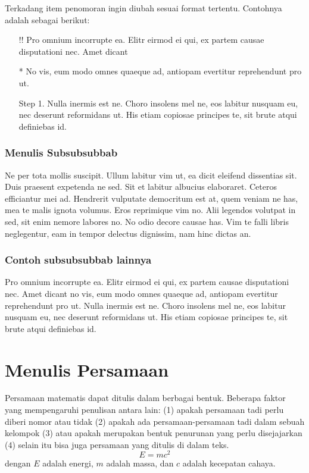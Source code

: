 Terkadang item penomoran ingin diubah sesuai format tertentu. Contohnya adalah sebagai berikut:
\begin{itemize}
    \item[!!] Pro omnium incorrupte ea. Elitr eirmod ei qui, ex partem causae disputationi nec. Amet dicant
    \item[*] No vis, eum modo omnes quaeque ad, antiopam evertitur reprehendunt pro ut.
    \item[Step 1.] Nulla inermis est ne. Choro insolens mel ne, eos labitur nusquam eu, nec deserunt reformidans ut. His etiam copiosae principes te, sit brute atqui definiebas id.
\end{itemize}


\subsubsection{Menulis Subsubsubbab}
Ne per tota mollis suscipit. Ullum labitur vim ut, ea dicit eleifend dissentias sit. Duis praesent expetenda ne sed. Sit et labitur albucius elaboraret. Ceteros efficiantur mei ad. Hendrerit vulputate democritum est at, quem veniam ne has, mea te malis ignota volumus. Eros reprimique vim no. Alii legendos volutpat in sed, sit enim nemore labores no. No odio decore causae has. Vim te falli libris neglegentur, eam in tempor delectus dignissim, nam hinc dictas an.

\subsubsection{Contoh subsubsubbab lainnya}
Pro omnium incorrupte ea. Elitr eirmod ei qui, ex partem causae disputationi nec. Amet dicant no vis, eum modo omnes quaeque ad, antiopam evertitur reprehendunt pro ut. Nulla inermis est ne. Choro insolens mel ne, eos labitur nusquam eu, nec deserunt reformidans ut. His etiam copiosae principes te, sit brute atqui definiebas id.



\section{Menulis Persamaan}
Persamaan matematis dapat ditulis dalam berbagai bentuk. Beberapa faktor yang mempengaruhi penulisan antara lain: (1) apakah persamaan tadi perlu diberi nomor atau tidak (2) apakah ada persamaan-persamaan tadi dalam sebuah kelompok (3) atau apakah merupakan bentuk penurunan yang perlu disejajarkan (4) selain itu bisa juga persamaan yang ditulis di dalam teks.
\begin{equation}
E=mc^2
\end{equation}
    dengan $E$ adalah energi, $m$ adalah massa, dan $c$ adalah kecepatan cahaya.

